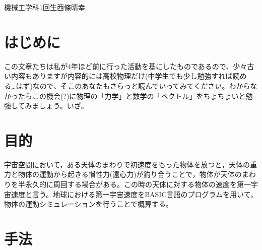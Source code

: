 \documentclass[11pt,b5paper,papersize,dvipdfmx]{jsbook}
\begin{document}

%
                {機械工学科1回生}{西條晴幸}

%
\section*{はじめに}
この文章たちは私が4年ほど前に行った活動を基にしたものであるので、少々古い内容もありますが内容的には高校物理だけ(中学生でも少し勉強すれば読める…はず)なので、そこのあなたもさらっと読んでいってみてください。わからなかったらこの機会(?)に物理の「力学」と数学の「ベクトル」をちょちょいと勉強してみましょう。いざ。

\section{目的}
宇宙空間において，ある天体のまわりで初速度をもった物体を放つと，天体の重力と物体の運動から起きる慣性力(遠心力)が釣り合うことで，物体が天体のまわりを半永久的に周回する場合がある。この時の天体に対する物体の速度を第一宇宙速度と言う。地球における第一宇宙速度をBASIC言語のプログラムを用いて，物体の運動シミュレーションを行うことで概算する。
\section{手法}
\end{document}
